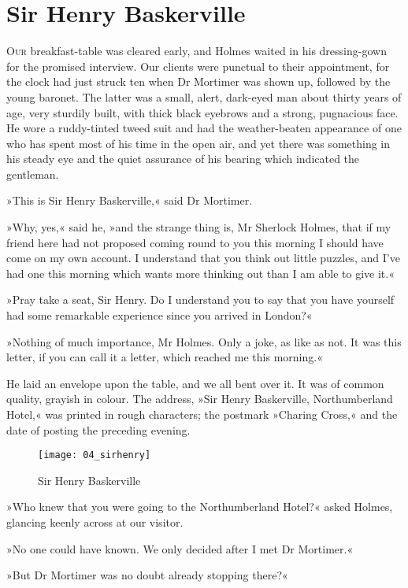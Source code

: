 \chapter{Sir Henry Baskerville}
\lettrine[lines=1]{O}{ur} breakfast-table was cleared early, and Holmes waited in his dressing-gown for the promised interview. Our clients were punctual to their appointment, for the clock had just struck ten when Dr Mortimer was shown up, followed by the young baronet. The latter was a small, alert, dark-eyed man about thirty years of age, very sturdily built, with thick black eyebrows and a strong, pugnacious face. He wore a ruddy-tinted tweed suit and had the weather-beaten appearance of one who has spent most of his time in the open air, and yet there was something in his steady eye and the quiet assurance of his bearing which indicated the gentleman.

»This is Sir Henry Baskerville,« said Dr Mortimer.

»Why, yes,« said he, »and the strange thing is, Mr Sherlock Holmes, that if my friend here had not proposed coming round to you this morning I should have come on my own account. I understand that you think out little puzzles, and I've had one this morning which wants more thinking out than I am able to give it.«

»Pray take a seat, Sir Henry. Do I understand you to say that you have yourself had some remarkable experience since you arrived in London?«

»Nothing of much importance, Mr Holmes. Only a joke, as like as not. It was this letter, if you can call it a letter, which reached me this morning.«

He laid an envelope upon the table, and we all bent over it. It was of common quality, grayish in colour. The address, »Sir Henry Baskerville, Northumberland Hotel,« was printed in rough characters; the postmark »Charing Cross,« and the date of posting the preceding evening.

\begin{figure}[p]
\centering
\texttt{[image: 04\_sirhenry]}
\caption{Sir Henry Baskerville}
\end{figure}

»Who knew that you were going to the Northumberland Hotel?« asked Holmes, glancing keenly across at our visitor.

»No one could have known. We only decided after I met Dr Mortimer.«

»But Dr Mortimer was no doubt already stopping there?«

